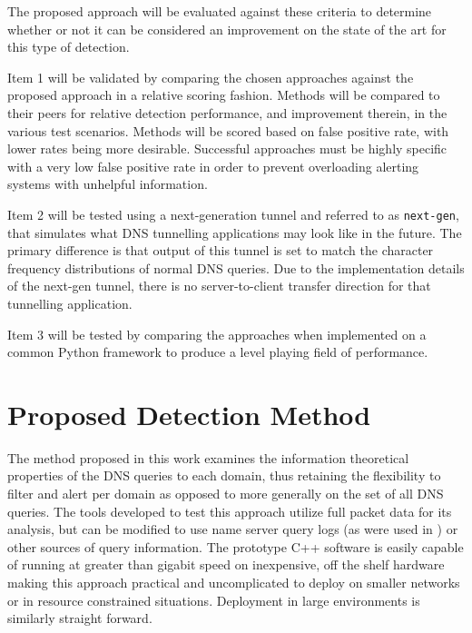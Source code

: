\documentclass{llncs}
\begin{document}
The proposed approach will be evaluated against these criteria to determine
whether or not it can be considered an improvement on the state of the art for
this type of detection. 


Item 1 will be validated by comparing the chosen approaches against the proposed
approach in a relative scoring fashion. Methods will be compared to their peers
for relative detection performance, and improvement therein, in the various test
scenarios. Methods will be scored based on false positive rate, with lower rates
being more desirable. Successful approaches must be highly specific with a very
low false positive rate in order to prevent overloading alerting systems with
unhelpful information.

Item 2 will be tested using a next-generation tunnel and referred to as
\texttt{next-gen}, that simulates what DNS tunnelling applications may look like
in the future. The primary difference is that output of this tunnel is set to
match the character frequency distributions of normal DNS queries. Due to the
implementation details of the next-gen tunnel, there is no server-to-client
transfer direction for that tunnelling application.

Item 3 will be tested by comparing the approaches when implemented on a common
Python framework to produce a level playing field of performance.

\section{Proposed Detection Method}
\label{proposed-method}

The method proposed in this work examines the information theoretical properties
of the DNS queries to each domain, thus retaining the flexibility to filter
and alert per domain as opposed to more generally on the set of all DNS queries.
The tools developed to test this approach utilize full packet data for its
analysis, but can be modified to use name server query logs (as were used in
\cite{Romana2007}) or other sources of query information. The prototype C++ software
is easily capable of running at greater than gigabit speed on inexpensive, off
the shelf hardware making this approach practical and uncomplicated to deploy on
smaller networks or in resource constrained situations. Deployment in large
environments is similarly straight forward.
\end{document}
